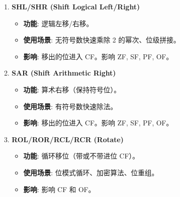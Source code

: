 \documentclass[12pt,a4paper]{ctexart}
\begin{document}
\begin{enumerate}
\begin{itemize}
        \item \textbf{影响}: CF=0, OF=0; 影响 ZF, SF, PF。
    \end{itemize}
    \item \textbf{SHL/SHR (Shift Logical Left/Right)}
    \begin{itemize}
        \item \textbf{功能}: 逻辑左移/右移。
        \item \textbf{使用场景}: 无符号数快速乘除 2 的幂次、位级拼接。
        \item \textbf{影响}: 移出的位进入 CF。影响 ZF, SF, PF, OF。
    \end{itemize}
    \item \textbf{SAR (Shift Arithmetic Right)}
    \begin{itemize}
        \item \textbf{功能}: 算术右移（保持符号位）。
        \item \textbf{使用场景}: 有符号数快速除法。
        \item \textbf{影响}: 移出的位进入 CF。影响 ZF, SF, PF, OF。
    \end{itemize}
    \item \textbf{ROL/ROR/RCL/RCR (Rotate)}
    \begin{itemize}
        \item \textbf{功能}: 循环移位（带或不带进位 CF）。
        \item \textbf{使用场景}: 位模式循环、加密算法、位重组。
        \item \textbf{影响}: 影响 CF 和 OF。
    \end{itemize}
\end{enumerate}
\end{document}
